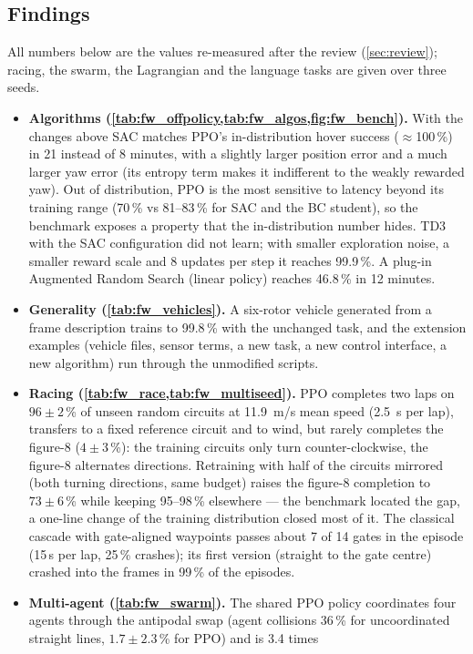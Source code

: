 \subsection{Findings}
All numbers below are the values re-measured after the review (\cref{sec:review}); racing, the swarm, the Lagrangian
and the language tasks are given over three seeds.
\begin{itemize}
\item \textbf{Algorithms (\cref{tab:fw_offpolicy,tab:fw_algos,fig:fw_bench}).} With the changes above SAC matches
PPO's in-distribution hover success ($\approx$100\,\%) in 21 instead of 8 minutes, with a slightly larger position error and a
much larger yaw error (its entropy term makes it indifferent to the weakly rewarded yaw). Out of distribution, PPO is
the most sensitive to latency beyond its training range (70\,\% vs 81--83\,\% for SAC and the BC student), so the
benchmark exposes a property that the in-distribution number hides. TD3 with the SAC configuration did not learn;
with smaller exploration noise, a smaller reward scale and 8 updates per step it reaches 99.9\,\%. A plug-in Augmented
Random Search (linear policy) reaches 46.8\,\% in 12 minutes.
\item \textbf{Generality (\cref{tab:fw_vehicles}).} A six-rotor vehicle generated from a frame description trains to
99.8\,\% with the unchanged task, and the extension examples (vehicle files, sensor terms, a new task, a new control
interface, a new algorithm) run through the unmodified scripts.
\item \textbf{Racing (\cref{tab:fw_race,tab:fw_multiseed}).} PPO completes two laps on $96\pm2$\,\% of unseen random
circuits at \SI{11.9}{m/s} mean speed (\SI{2.5}{s} per lap), transfers to a fixed reference circuit and to wind, but
rarely completes the figure-8 ($4\pm3$\,\%): the training circuits only turn counter-clockwise, the figure-8
alternates directions. Retraining with half of the circuits mirrored (both turning directions, same budget) raises the
figure-8 completion to $73\pm6$\,\% while keeping 95--98\,\% elsewhere --- the benchmark located the gap, a one-line
change of the training distribution closed most of it.
The classical cascade with gate-aligned waypoints passes about 7 of 14 gates in the episode (15\,s per lap, 25\,\%
crashes); its first version (straight to the gate centre) crashed into the frames in 99\,\% of the episodes.
\item \textbf{Multi-agent (\cref{tab:fw_swarm}).} The shared PPO policy coordinates four agents through the
antipodal swap (agent collisions 36\,\% for uncoordinated straight lines, $1.7\pm2.3$\,\% for PPO) and is 3.4 times

\end{itemize}

